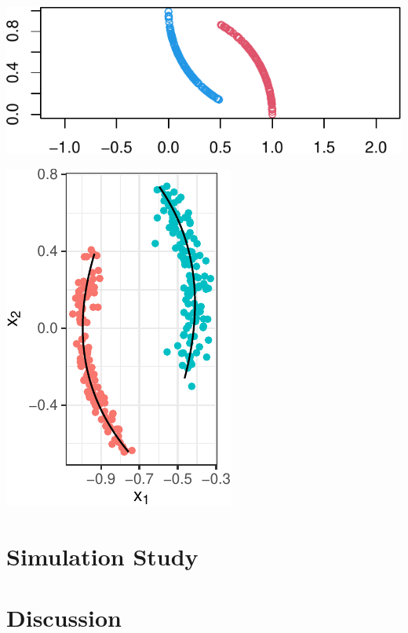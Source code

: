 \documentclass[12pt]{article}
\begin{document}
\begin{example}


\begin{center}\includegraphics{draft_files/figure-latex/unnamed-chunk-12-1} \end{center}






\begin{center}\includegraphics{draft_files/figure-latex/unnamed-chunk-15-1} \end{center}

\end{example}

\hypertarget{simulation-study}{%
\section{Simulation Study}\label{simulation-study}}

\hypertarget{discussion}{%
\section{Discussion}\label{discussion}}
\end{document}
